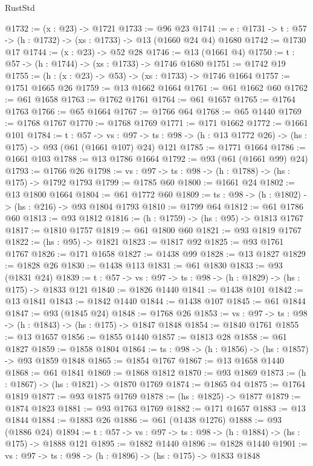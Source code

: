 \begin{lexlean}{RustStd}
\begin{coremodule}
@1732 := (x : @23) -> @1721
@1733 := @96 @23
@1741 := {e : @1731} -> {t : @57} -> (h : @1732) -> (xs : @1733) -> @13 (@1660 @24 @4) @1680
@1742 := @1730 @17
@1744 := (x : @23) -> @52 @28
@1746 := @13 (@1661 @4)
@1750 := {t : @57} -> (h : @1744) -> (xs : @1733) -> @1746 @1680
@1751 := @1742 @19
@1755 := (h : (x : @23) -> @53) -> (xs : @1733) -> @1746 @1664
@1757 := @1751 @1665 @26
@1759 := @13 @1662 @1664
@1761 := @61 @1662 @60
@1762 := @61 @1658
@1763 := @1762 @1761
@1764 := @61 @1657
@1765 := @1764 @1763
@1766 := @65 @1664
@1767 := @1766 @64
@1768 := @65 @1440
@1769 := @1768 @1767
@1770 := @1768 @1769
@1771 := @171 @1662
@1772 := @1661 @101
@1784 := {t : @57} ->
  {vs : @97} -> {ts : @98} -> (h : @13 @1772 @26) -> (hs : @175) -> @93 (@61 (@1661 @107) @24) @121
@1785 := @1771 @1664
@1786 := @1661 @103
@1788 := @13 @1786 @1664
@1792 := @93 (@61 (@1661 @99) @24)
@1793 := @1766 @26
@1798 := {vs : @97} -> {ts : @98} -> (h : @1788) -> (hs : @175) -> @1792 @1793
@1799 := @1785 @60
@1800 := @1661 @24
@1802 := @13 @1800 @1664
@1804 := @61 @1772 @60
@1809 := {ts : @98} -> (h : @1802) -> (hs : @216) -> @93 @1804 @1793
@1810 := @1799 @64
@1812 := @61 @1786 @60
@1813 := @93 @1812
@1816 := (h : @1759) -> (hs : @95) -> @1813 @1767
@1817 := @1810 @1757
@1819 := @61 @1800 @60
@1821 := @93 @1819 @1767
@1822 := (hs : @95) -> @1821
@1823 := @1817 @92
@1825 := @93 @1761 @1767
@1826 := @171 @1658
@1827 := @1438 @99
@1828 := @13 @1827
@1829 := @1828 @26
@1830 := @1438 @113
@1831 := @61 @1830
@1833 := @93 (@1831 @24)
@1839 := {t : @57} -> {vs : @97} -> {ts : @98} -> (h : @1829) -> (hs : @175) -> @1833 @121
@1840 := @1826 @1440
@1841 := @1438 @101
@1842 := @13 @1841
@1843 := @1842 @1440
@1844 := @1438 @107
@1845 := @61 @1844
@1847 := @93 (@1845 @24)
@1848 := @1768 @26
@1853 := {vs : @97} -> {ts : @98} -> (h : @1843) -> (hs : @175) -> @1847 @1848
@1854 := @1840 @1761
@1855 := @13 @1657
@1856 := @1855 @1440
@1857 := @1813 @28
@1858 := @61 @1827
@1859 := @1858 @1804
@1864 := {ts : @98} -> (h : @1856) -> (hs : @1857) -> @93 @1859 @1848
@1865 := @1854 @1767
@1867 := @13 @1658 @1440
@1868 := @61 @1841
@1869 := @1868 @1812
@1870 := @93 @1869
@1873 := (h : @1867) -> (hs : @1821) -> @1870 @1769
@1874 := @1865 @4
@1875 := @1764 @1819
@1877 := @93 @1875 @1769
@1878 := (hs : @1825) -> @1877
@1879 := @1874 @1823
@1881 := @93 @1763 @1769
@1882 := @171 @1657
@1883 := @13 @1844
@1884 := @1883 @26
@1886 := @61 (@1438 @1276)
@1888 := @93 (@1886 @24)
@1894 := {t : @57} -> {vs : @97} -> {ts : @98} -> (h : @1884) -> (hs : @175) -> @1888 @121
@1895 := @1882 @1440
@1896 := @1828 @1440
@1901 := {vs : @97} -> {ts : @98} -> (h : @1896) -> (hs : @175) -> @1833 @1848

\end{coremodule}
\end{lexlean}
